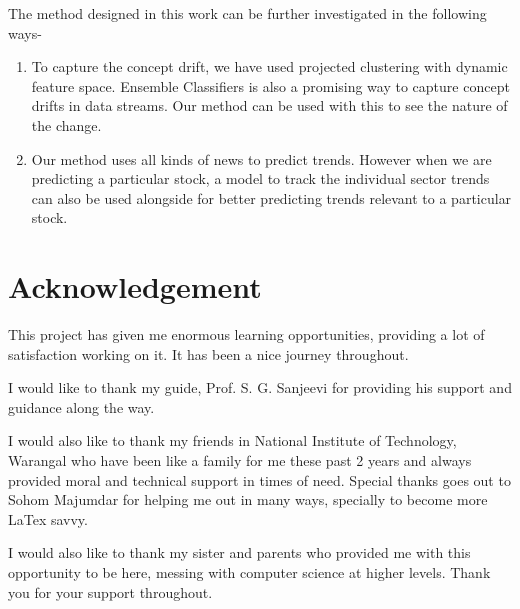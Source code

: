 \documentclass[a4paper,12bp]{report}
\begin{document}
The method designed in this work can be further investigated in the following ways- 
\begin{enumerate}
\item To capture the concept drift, we have used projected clustering with dynamic feature space. Ensemble Classifiers is also a promising way to capture concept drifts in data streams. Our method can be used with this to see the nature of the change.

\item Our method uses all kinds of news to predict trends. However when we are predicting a particular stock, a model to track the individual sector trends can also be used alongside for better predicting trends relevant to a particular stock.
\end{enumerate}

\titlespacing*{\chapter}{0pt}{10mm}{10mm}
\setlength{\parskip}{\baselineskip}

{}

\chapter*{Acknowledgement}
\thispagestyle{empty}
This project has given me enormous learning opportunities, providing a lot of satisfaction working on it. It has been a nice journey throughout.

I would like to thank my guide, Prof. S. G. Sanjeevi for providing his support and guidance along the way.

I would also like to thank my friends in National Institute of Technology, Warangal who have been like a family for me these past 2 years and always provided moral and technical support in times of need. Special thanks goes out to Sohom Majumdar for helping me out in many ways, specially to become more LaTex savvy.

I would also like to thank my sister and parents who provided me with this opportunity to be here, messing with computer science at higher levels. Thank you for your support throughout. 
\end{document}
